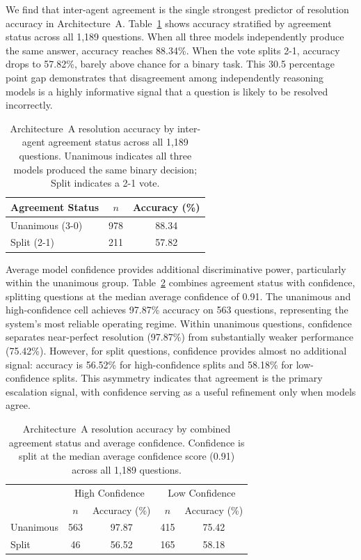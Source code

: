 We find that inter-agent agreement is the single strongest predictor of resolution accuracy in Architecture~A. Table~\ref{tab:agreement_status} shows accuracy stratified by agreement status across all 1,189 questions. When all three models independently produce the same answer, accuracy reaches 88.34\%. When the vote splits 2-1, accuracy drops to 57.82\%, barely above chance for a binary task. This 30.5 percentage point gap demonstrates that disagreement among independently reasoning models is a highly informative signal that a question is likely to be resolved incorrectly.
 
\begin{table}[h]
\centering
\caption{Architecture~A resolution accuracy by inter-agent agreement status across all 1,189 questions. Unanimous indicates all three models produced the same binary decision; Split indicates a 2-1 vote.}
\label{tab:agreement_status}
\begin{tabular}{lcc}
\hline
Agreement Status & $n$ & Accuracy (\%) \\
\hline
Unanimous (3-0) & 978 & 88.34 \\
Split (2-1) & 211 & 57.82 \\
\hline
\end{tabular}
\end{table}
 
Average model confidence provides additional discriminative power, particularly within the unanimous group. Table~\ref{tab:signal_2x2} combines agreement status with confidence, splitting questions at the median average confidence of 0.91. The unanimous and high-confidence cell achieves 97.87\% accuracy on 563 questions, representing the system's most reliable operating regime. Within unanimous questions, confidence separates near-perfect resolution (97.87\%) from substantially weaker performance (75.42\%). However, for split questions, confidence provides almost no additional signal: accuracy is 56.52\% for high-confidence splits and 58.18\% for low-confidence splits. This asymmetry indicates that agreement is the primary escalation signal, with confidence serving as a useful refinement only when models agree.
 
\begin{table}[h]
\centering
\caption{Architecture~A resolution accuracy by combined agreement status and average confidence. Confidence is split at the median average confidence score (0.91) across all 1,189 questions.}
\label{tab:signal_2x2}
\begin{tabular}{lcccc}
\hline
 & \multicolumn{2}{c}{High Confidence} & \multicolumn{2}{c}{Low Confidence} \\
 & $n$ & Accuracy (\%) & $n$ & Accuracy (\%) \\
\hline
Unanimous & 563 & 97.87 & 415 & 75.42 \\
Split & 46 & 56.52 & 165 & 58.18 \\
\hline
\end{tabular}
\end{table}
 
